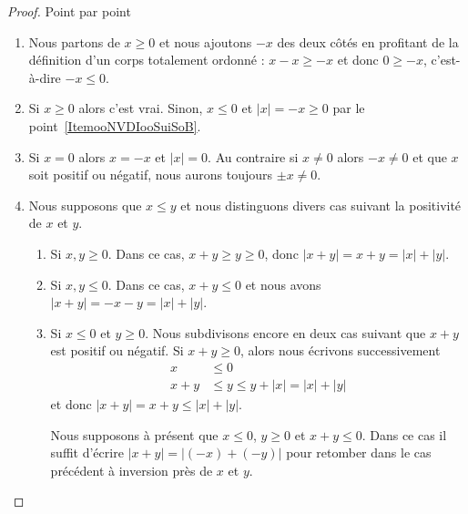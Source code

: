 \begin{proof}
    Point par point
    \begin{enumerate}
        \item
            Nous partons de \( x\geq 0\) et nous ajoutons \( -x\) des deux côtés en profitant de la définition d'un corps totalement ordonné : \( x-x\geq -x\) et donc \( 0\geq-x\), c'est-à-dire \( -x\leq 0\).
        \item
            Si \( x\geq 0\) alors c'est vrai. Sinon, \( x\leq 0\) et \( | x |=-x\geq 0\) par le point~\ref{ItemooNVDIooSuiSoB}.
        \item
            Si \( x=0\) alors \( x=-x\) et \( | x |=0\). Au contraire si \(x\neq 0\) alors \( -x\neq 0\) et que \( x\) soit positif ou négatif, nous aurons toujours \( \pm x\neq 0\).
        \item
            Nous supposons que \( x\leq y\) et nous distinguons divers cas suivant la positivité de \( x\) et \( y\).
            \begin{enumerate}
                \item
                    Si \( x,y\geq 0\). Dans ce cas, \( x+y\geq y\geq 0\), donc \( | x+y |=x+y=| x |+| y |\).
                \item
                    Si \( x,y\leq 0\). Dans ce cas, \( x+y\leq 0\) et nous avons \( | x+y |=-x-y=| x |+| y |\).
                \item
                    Si \( x\leq 0\) et \( y\geq 0\). Nous subdivisons encore en deux cas suivant que \( x+y\) est positif ou négatif. Si \( x+y\geq 0\), alors nous écrivons successivement
                    \begin{subequations}
                        \begin{align}
                            x&\leq 0\\
                            x+y&\leq y\leq y+| x |=| x |+| y |
                        \end{align}
                    \end{subequations}
                    et donc \( | x+y |=x+y\leq | x |+| y |\).

                    Nous supposons à présent que \( x\leq 0\), \( y\geq 0\) et \( x+y\leq 0\). Dans ce cas il suffit d'écrire \( | x+y |=| (-x)+(-y) |\) pour retomber dans le cas précédent à inversion près de \( x\) et \( y\).
            \end{enumerate}
    \end{enumerate}
\end{proof}

